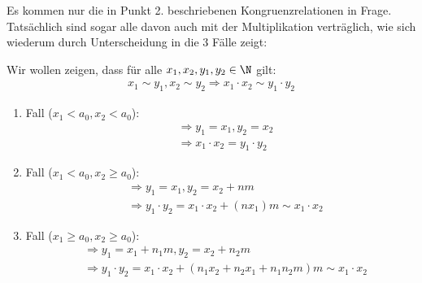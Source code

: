 \begin{solution}
\begin{itemize}
Es kommen nur die in Punkt 2. beschriebenen Kongruenzrelationen in Frage. Tatsächlich sind sogar alle davon auch mit der Multiplikation verträglich, wie sich wiederum durch Unterscheidung in die 3 Fälle zeigt:

Wir wollen zeigen, dass für alle $x_1,x_2,y_1,y_2 \in \N$ gilt:
\begin{align*}
  x_1 \sim y_1,x_2 \sim y_2 \Rightarrow x_1 \cdot x_2 \sim y_1 \cdot y_2
\end{align*}

\begin{enumerate}[label = \textit{\arabic*.}]
\item Fall ($x_1 < a_0, x_2 < a_0$):
\begin{align*}
  &\Rightarrow y_1 = x_1, y_2 = x_2 \\
  &\Rightarrow x_1 \cdot x_2 = y_1 \cdot y_2
\end{align*}
\item Fall ($x_1 < a_0, x_2 \geq a_0$):
\begin{align*}
  &\Rightarrow y_1 = x_1, y_2 = x_2 + nm \\
  &\Rightarrow  y_1 \cdot y_2 = x_1 \cdot x_2 + (nx_1)m \sim x_1 \cdot x_2
\end{align*}
\item Fall ($x_1 \geq a_0, x_2 \geq a_0$):
\begin{align*}
  &\Rightarrow y_1 = x_1 + n_1 m, y_2 = x_2 + n_2 m \\
  &\Rightarrow  y_1 \cdot y_2 = x_1 \cdot x_2 + (n_1 x_2 +n_2 x_1 + n_1 n_2 m) m \sim x_1 \cdot x_2
\end{align*}
\end{enumerate}

\end{itemize}
\end{solution}
